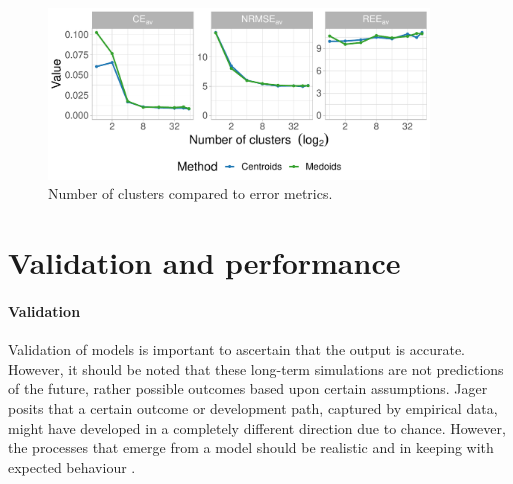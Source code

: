 \begin{figure}
	\centering
	\includegraphics[width=0.9\textwidth]{Chapter4/figures/e-Energy-2020/methods_and_materials/clusters_compared_ggplot.pdf}
	\caption{Number of clusters compared to error metrics.}
	\label{fig:error_metrics_vs_cluster_number}
\end{figure}




\section{Validation and performance}
\paragraph{Validation}

Validation of models is important to ascertain that the output is accurate. However, it should be noted that these long-term simulations are not predictions of the future, rather possible outcomes based upon certain assumptions. Jager posits that a certain outcome or development path, captured by empirical data, might have developed in a completely different direction due to chance. However, the processes that emerge from a model should be realistic and in keeping with expected behaviour \cite{Jager2006a}.

